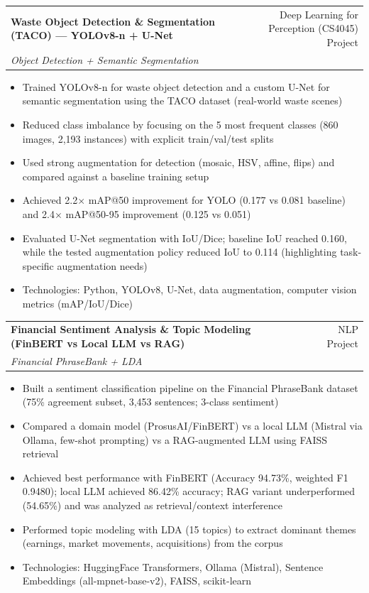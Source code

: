 \documentclass[a4paper,12pt]{article}
\makeatletter
\newenvironment{projectdetailed}[3]
    {
    \begin{tabularx}{\linewidth}{@{}l X r@{}}
    \textbf{#1} & \hfill & #2 \\
    \textit{#3} & & \\[3.75pt]
    \end{tabularx}
    \begin{minipage}[t]{\linewidth}
    \begin{itemize}[nosep,after=\strut, leftmargin=1em, itemsep=2pt,label=--]
    }
    {
    \end{itemize}
    \end{minipage}
    \vspace{6pt}
    }
\makeatother
\begin{document}
\begin{projectdetailed}{Waste Object Detection \& Segmentation (TACO) — YOLOv8-n + U-Net}{Deep Learning for Perception (CS4045) Project}{Object Detection + Semantic Segmentation}
\item Trained YOLOv8-n for waste object detection and a custom U-Net for semantic segmentation using the TACO dataset (real-world waste scenes)
\item Reduced class imbalance by focusing on the 5 most frequent classes (860 images, 2,193 instances) with explicit train/val/test splits
\item Used strong augmentation for detection (mosaic, HSV, affine, flips) and compared against a baseline training setup
\item Achieved 2.2$\times$ mAP@50 improvement for YOLO (0.177 vs 0.081 baseline) and 2.4$\times$ mAP@50-95 improvement (0.125 vs 0.051)
\item Evaluated U-Net segmentation with IoU/Dice; baseline IoU reached 0.160, while the tested augmentation policy reduced IoU to 0.114 (highlighting task-specific augmentation needs)
\item Technologies: Python, YOLOv8, U-Net, data augmentation, computer vision metrics (mAP/IoU/Dice)
\end{projectdetailed}

\begin{projectdetailed}{Financial Sentiment Analysis \& Topic Modeling (FinBERT vs Local LLM vs RAG)}{NLP Project}{Financial PhraseBank + LDA}
\item Built a sentiment classification pipeline on the Financial PhraseBank dataset (75\% agreement subset, 3,453 sentences; 3-class sentiment)
\item Compared a domain model (ProsusAI/FinBERT) vs a local LLM (Mistral via Ollama, few-shot prompting) vs a RAG-augmented LLM using FAISS retrieval
\item Achieved best performance with FinBERT (Accuracy 94.73\%, weighted F1 0.9480); local LLM achieved 86.42\% accuracy; RAG variant underperformed (54.65\%) and was analyzed as retrieval/context interference
\item Performed topic modeling with LDA (15 topics) to extract dominant themes (earnings, market movements, acquisitions) from the corpus
\item Technologies: HuggingFace Transformers, Ollama (Mistral), Sentence Embeddings (all-mpnet-base-v2), FAISS, scikit-learn
\end{projectdetailed}
\end{document}
